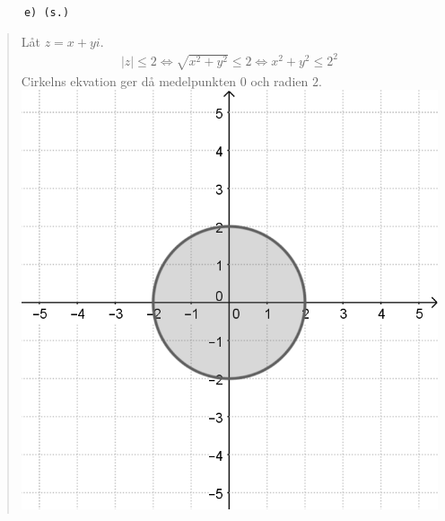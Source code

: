 \documentclass[a4paper]{article}
\newcommand{\tskcol}[1]{\textcolor{tskcol}{#1}}
\begin{document}
	\texttt{\tskcol{~~~~~~e) (s.)}}
	\begin{quotation}
		\noindent
		Låt $z=x+yi$.
		\begin{align*}
		|z| \le 2 \Leftrightarrow
		\sqrt{x^2+y^2} \le 2 \Leftrightarrow
		x^2+y^2 \le 2^2
		\end{align*}
		Cirkelns ekvation ger då medelpunkten $0$ och radien $2$. \\
		\includegraphics[scale=0.2]{images/612e.PNG}
	\end{quotation}
	
\end{document}
